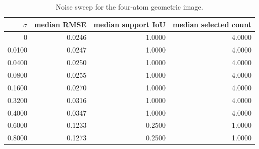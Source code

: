 \begin{table}[htbp]\centering\small
\caption{Noise sweep for the four-atom geometric image.}\label{tab:two-d-noise}
\begin{tabular}{rrrr}\toprule
$\sigma$ & median RMSE & median support IoU & median selected count\\\midrule
0 & 0.0246 & 1.0000 & 4.0000\\
0.0100 & 0.0247 & 1.0000 & 4.0000\\
0.0400 & 0.0250 & 1.0000 & 4.0000\\
0.0800 & 0.0255 & 1.0000 & 4.0000\\
0.1600 & 0.0270 & 1.0000 & 4.0000\\
0.3200 & 0.0316 & 1.0000 & 4.0000\\
0.4000 & 0.0347 & 1.0000 & 4.0000\\
0.6000 & 0.1233 & 0.2500 & 1.0000\\
0.8000 & 0.1273 & 0.2500 & 1.0000\\
\bottomrule\end{tabular}\end{table}